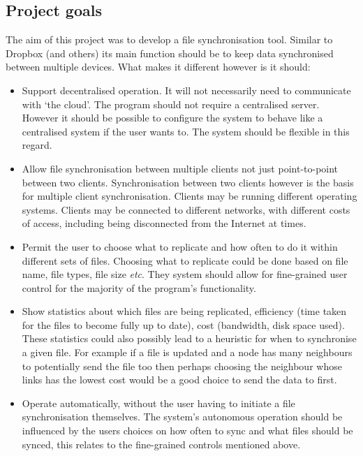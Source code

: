 \documentclass[12pt]{article}
\begin{document}
\subsection{Project goals}
The aim of this project was to develop a file synchronisation tool.
Similar to  Dropbox (and others) its main function should be to
keep data synchronised between multiple devices.
What makes it different however is it should:
\begin{itemize}
\item Support decentralised operation. It will not necessarily need to communicate with
`the cloud'. The program should not require a
centralised server. However it should be
possible to configure the system to behave like a centralised system if the user wants to.
The system should be flexible in this regard.

\item Allow file synchronisation between multiple clients not just point-to-point
between two clients. Synchronisation between two clients however is the
basis for multiple client synchronisation. Clients may be
running different operating systems. Clients may be connected to
different networks, with different costs of access, including being disconnected
from the Internet at times.

\item Permit the user to choose what to replicate and how often to do
it within different sets of files. Choosing what to replicate could be done
based on file name, file types, file size \emph{etc}. They system should
allow for fine-grained user control for the majority of the program's functionality.

\item Show statistics about which files are being replicated, efficiency (time
taken for the files to become fully up to date),
cost (bandwidth, disk space used). These statistics could also possibly lead
to a heuristic for when to synchronise a given file. For example if a file is
updated and a node has many neighbours to potentially send the file too then perhaps
choosing the neighbour whose links has the lowest cost would be a good choice
to send the data to first.

\item Operate automatically, without the user having to initiate a file
synchronisation themselves. 
The system's autonomous operation should be influenced by the users
choices on how often to sync and what files should be synced, this
relates to the fine-grained controls mentioned above.
\end{itemize}
\end{document}

